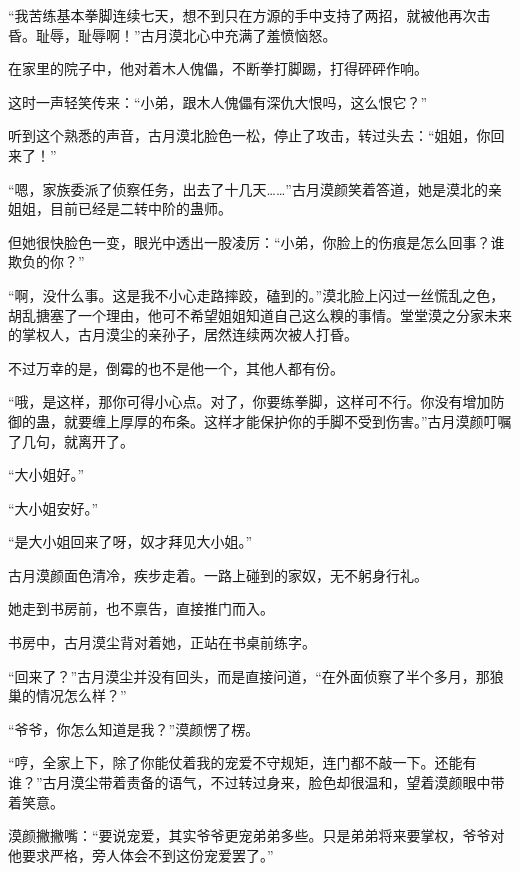 
\begin{this_body}



“我苦练基本拳脚连续七天，想不到只在方源的手中支持了两招，就被他再次击昏。耻辱，耻辱啊！”古月漠北心中充满了羞愤恼怒。

在家里的院子中，他对着木人傀儡，不断拳打脚踢，打得砰砰作响。

这时一声轻笑传来：“小弟，跟木人傀儡有深仇大恨吗，这么恨它？”

听到这个熟悉的声音，古月漠北脸色一松，停止了攻击，转过头去：“姐姐，你回来了！”

“嗯，家族委派了侦察任务，出去了十几天……”古月漠颜笑着答道，她是漠北的亲姐姐，目前已经是二转中阶的蛊师。

但她很快脸色一变，眼光中透出一股凌厉：“小弟，你脸上的伤痕是怎么回事？谁欺负的你？”

“啊，没什么事。这是我不小心走路摔跤，磕到的。”漠北脸上闪过一丝慌乱之色，胡乱搪塞了一个理由，他可不希望姐姐知道自己这么糗的事情。堂堂漠之分家未来的掌权人，古月漠尘的亲孙子，居然连续两次被人打昏。

不过万幸的是，倒霉的也不是他一个，其他人都有份。

“哦，是这样，那你可得小心点。对了，你要练拳脚，这样可不行。你没有增加防御的蛊，就要缠上厚厚的布条。这样才能保护你的手脚不受到伤害。”古月漠颜叮嘱了几句，就离开了。

“大小姐好。”

“大小姐安好。”

“是大小姐回来了呀，奴才拜见大小姐。”

古月漠颜面色清冷，疾步走着。一路上碰到的家奴，无不躬身行礼。

她走到书房前，也不禀告，直接推门而入。

书房中，古月漠尘背对着她，正站在书桌前练字。

“回来了？”古月漠尘并没有回头，而是直接问道，“在外面侦察了半个多月，那狼巢的情况怎么样？”

“爷爷，你怎么知道是我？”漠颜愣了楞。

“哼，全家上下，除了你能仗着我的宠爱不守规矩，连门都不敲一下。还能有谁？”古月漠尘带着责备的语气，不过转过身来，脸色却很温和，望着漠颜眼中带着笑意。

漠颜撇撇嘴：“要说宠爱，其实爷爷更宠弟弟多些。只是弟弟将来要掌权，爷爷对他要求严格，旁人体会不到这份宠爱罢了。”


\end{this_body}
